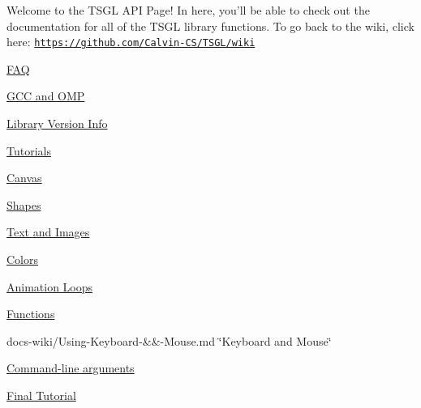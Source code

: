 Welcome to the T\-S\-G\-L A\-P\-I Page! In here, you'll be able to check out the documentation for all of the T\-S\-G\-L library functions. To go back to the wiki, click here\-: \href{https://github.com/Calvin-CS/TSGL/wiki}{\tt https\-://github.\-com/\-Calvin-\/\-C\-S/\-T\-S\-G\-L/wiki}
\begin{DoxyItemize}
\item \hyperlink{md__home_cpd5_workspace__t_s_g_l_docs-wiki__f_a_q}{F\-A\-Q}
\item \hyperlink{md__home_cpd5_workspace__t_s_g_l_docs-wiki__g_c_c-and-_o_m_p}{G\-C\-C and O\-M\-P}
\item \hyperlink{md__home_cpd5_workspace__t_s_g_l_docs-wiki__library-_versions}{Library Version Info}
\item \hyperlink{md__home_cpd5_workspace__t_s_g_l_docs-wiki__using-_canvas}{Tutorials}
\begin{DoxyItemize}
\item \hyperlink{md__home_cpd5_workspace__t_s_g_l_docs-wiki__using-_canvas}{Canvas}
\item \hyperlink{md__home_cpd5_workspace__t_s_g_l_docs-wiki_tutorials__using-_shapes}{Shapes}
\item \hyperlink{md__home_cpd5_workspace__t_s_g_l_docs-wiki__using-_text-and-_images}{Text and Images}
\item \hyperlink{md__home_cpd5_workspace__t_s_g_l_docs-wiki_tutorials__using-_colors}{Colors}
\item \hyperlink{md__home_cpd5_workspace__t_s_g_l_docs-wiki__animation-_loops}{Animation Loops}
\item \hyperlink{md__home_cpd5_workspace__t_s_g_l_docs-wiki_tutorials__using-_functions}{Functions}
\item docs-\/wiki/\-Using-\/\-Keyboard-\/\&\&-\/\-Mouse.\-md \char`\"{}\-Keyboard and Mouse\char`\"{}
\item \hyperlink{md__home_cpd5_workspace__t_s_g_l_docs-wiki__command-line-arguments}{Command-\/line arguments}
\item \hyperlink{md__home_cpd5_workspace__t_s_g_l_docs-wiki__bringing-_it-_all-_together}{Final Tutorial}
\end{DoxyItemize}
\end{DoxyItemize}